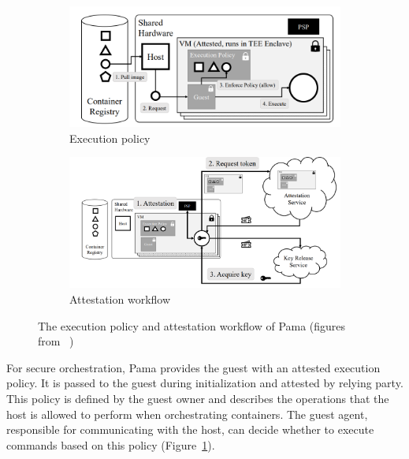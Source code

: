 \begin{figure}[htp]
    \centering
    \begin{subfigure}[b]{0.45\textwidth}
        \centering
        \includegraphics[width=\textwidth]{images/pama_policy.png}
        \caption{Execution policy}
        \label{fig:pama_policy}
    \end{subfigure}
    \hfill
    \begin{subfigure}[b]{0.45\textwidth}
        \centering
        \includegraphics[width=\textwidth]{images/pama_atte.png}
        \caption{Attestation workflow}
        \label{fig:pama_atte}
    \end{subfigure}
    \hfill
       \caption[The execution policy and attestation workflow of Pama]{The execution policy and attestation workflow of Pama (figures from~\cite*{Johnson2023ParmaCC} )}
       \label{fig:pama}
\end{figure}

For secure orchestration, Pama provides the guest with an attested execution policy. It is passed to the guest during initialization and attested by relying party. This policy is defined by the guest owner and describes the operations that the host is allowed to perform when orchestrating 
containers. The guest agent, responsible for communicating with the host, can decide whether to execute commands based on this policy (Figure~\ref{fig:pama_policy}).  


